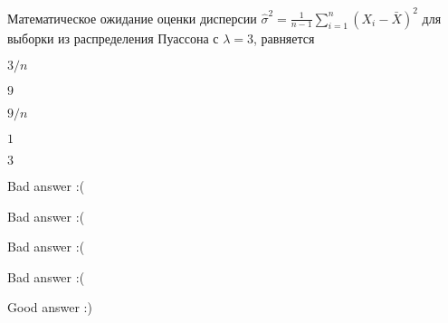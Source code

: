 
\begin{question}
Математическое ожидание оценки дисперсии
\(\hat \sigma^2=\frac{1}{n-1}\sum_{i=1}^{n}(X_i - \bar X)^2\) для
выборки из распределения Пуассона с \(\lambda = 3\), равняется
\begin{answerlist}
  \item \(3/n\)
  \item \(9\)
  \item \(9/n\)
  \item \(1\)
  \item \(3\)
\end{answerlist}
\end{question}

\begin{solution}
\begin{answerlist}
  \item Bad answer :(
  \item Bad answer :(
  \item Bad answer :(
  \item Bad answer :(
  \item Good answer :)
\end{answerlist}
\end{solution}

